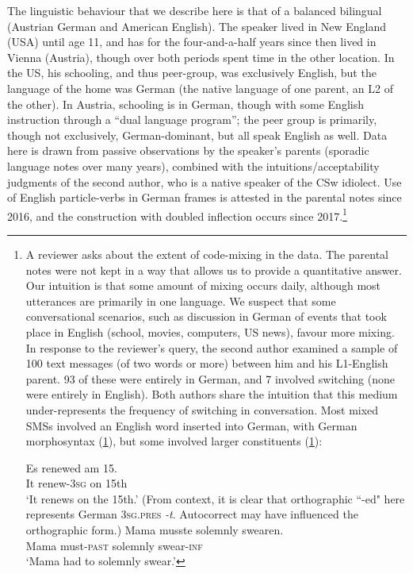 \documentclass[output=paper]{langscibook}
\begin{document}
The linguistic behaviour that we describe here is that of a balanced bilingual (Austrian German and American English). The speaker lived in New England (USA) until age 11, and has for the four-and-a-half years since then lived in Vienna (Austria), though over both periods spent time in the other location. In the US, his schooling, and thus peer-group, was exclusively English, but the language of the home was German (the native language of one parent, an  L2 of the other). In Austria, schooling is in German, though with some English instruction through a ``dual language program''; the peer group is primarily, though not exclusively, German-dominant, but all speak English as well. Data here is drawn from passive observations by the speaker's parents (sporadic language notes over many years), combined with the intuitions/acceptability judgments of the second author, who is a native speaker of the CSw idiolect. Use of English particle-verbs in German frames is attested in the parental notes since 2016, and the construction with doubled inflection occurs since 2017.\footnote{A reviewer asks about the extent of code-mixing in the data. The parental notes were not kept in a way that allows us to provide a quantitative answer. Our intuition is that some amount of mixing occurs daily, although most utterances are primarily in one language. We suspect that some conversational scenarios, such as discussion in German of events that took place in English (school, movies, computers, US news), favour more mixing. In response to the reviewer's query, the second author examined a sample of 100 text messages (of two words or more) between him and his L1-English parent. 93 of these were entirely in German, and 7 involved switching (none were entirely in English). Both authors share the intuition that this medium under-represents the frequency of switching in conversation. Most mixed SMSs involved an English word inserted into German, with German morphosyntax (\ref{renewed}), but some involved larger constituents (\ref{solemnly}): 

\ea\gll \label{renewed}Es renewed am 15.\\
It renew-{\textsc{3sg}} on 15th\\
\glt `It renews on the 15th.' (From context, it is clear that orthographic ``-ed" here represents German \textsc{3sg.pres} \textit{-t}. Autocorrect may have influenced the orthographic form.)
\ex\gll \label{solemnly}Mama musste solemnly swearen.\\
Mama must-{\textsc{past}} solemnly swear-\textsc{inf}\\
\glt `Mama had to solemnly swear.'
\z 
} 
\end{document}
